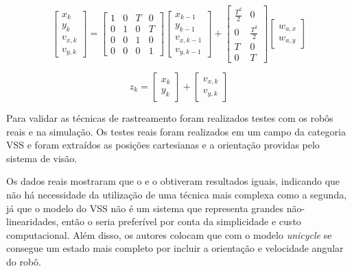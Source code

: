 \documentclass[acronym, symbols, table]{fei}
\begin{document}
\begin{equation}\label{eq:differential_equation_vsss_3}
	\begin{bmatrix}
		x_k \\ y_k \\ v_{x,k} \\ v_{y,k}
	\end{bmatrix} = 
	\begin{bmatrix}
		1 & 0 & T & 0 \\
		0 & 1 & 0 & T \\
		0 & 0 & 1 & 0 \\
		0 & 0 & 0 & 1
	\end{bmatrix}
	\begin{bmatrix}
		x_{k-1} \\ y_{k-1} \\ v_{x,k-1} \\ v_{y,k-1}
	\end{bmatrix} + 
	\begin{bmatrix}
		\frac{T^{2}}{2} & 0 \\
		0 & \frac{T^{2}}{2} \\
		T & 0 \\
		0 & T
	\end{bmatrix}
	\begin{bmatrix}
		w_{a,x} \\
		w_{a,y}
	\end{bmatrix}
\end{equation}

\begin{equation}\label{eq:differential_equation_vsss_4}
	z_k = 
	\begin{bmatrix}
		x_k \\ y_k
	\end{bmatrix} + 
	\begin{bmatrix}
		v_{x,k} \\ v_{y,k}
	\end{bmatrix}
\end{equation}

Para validar as técnicas de rastreamento foram realizados testes com os robôs reais e na simulação. Os testes reais foram realizados em um campo da categoria VSS e foram extraídos as posições cartesianas e a orientação providas pelo sistema de visão.

Os dados reais mostraram que o  e o  obtiveram resultados iguais, indicando que não há necessidade da utilização de uma técnica mais complexa como a segunda, já que o modelo do VSS não é um sistema que representa grandes não-linearidades, então o  seria preferível por conta da simplicidade e custo computacional. Além disso, os autores colocam que com o modelo \textit{unicycle} se consegue um estado mais completo por incluir a orientação e velocidade angular do robô.
\end{document}
